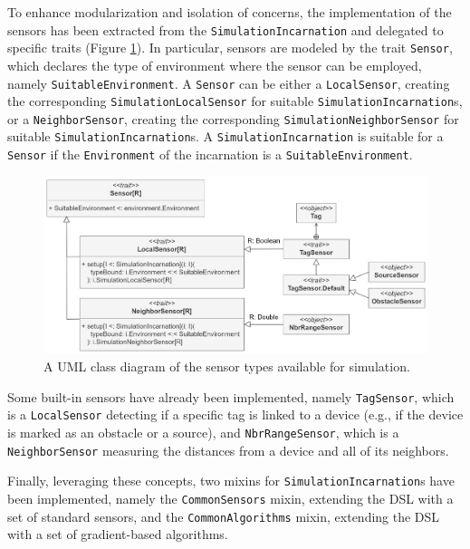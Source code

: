 To enhance modularization and isolation of concerns, the implementation of the
sensors has been extracted from the \texttt{SimulationIncarnation} and
delegated to specific traits (Figure \ref{figure:sensor-class-diagram}). In
particular, sensors are modeled by the trait \texttt{Sensor}, which declares
the type of environment where the sensor can be employed, namely
\texttt{SuitableEnviron\-ment}. A \texttt{Sensor} can be either a
\texttt{LocalSensor}, creating the corresponding
\texttt{Simula\-tion\-LocalSensor} for suitable
\texttt{SimulationIncarnation}s, or a \texttt{NeighborSensor}, creating the
corresponding \texttt{SimulationNeighborSensor} for suitable
\texttt{Simulation\-Incarnation}s. A \texttt{SimulationIncarnation} is suitable
for a \texttt{Sensor} if the \texttt{Environ\-ment} of the incarnation is a
\texttt{SuitableEnvironment}.

\begin{figure}[!ht]
  \centering
  \includegraphics[width=1\textwidth]{resources/figures/diagrams/short/sensor-class-diagram.pdf}
  \caption[A UML class diagram of the sensor types in FRASP]{
    A UML class diagram of the sensor types available for simulation.
  }
  \label{figure:sensor-class-diagram}
\end{figure}

Some built-in sensors have already been implemented, namely \texttt{TagSensor},
which is a \texttt{LocalSensor} detecting if a specific tag is linked to a
device (e.g., if the device is marked as an obstacle or a source), and
\texttt{NbrRangeSensor}, which is a \texttt{NeighborSensor} measuring the
distances from a device and all of its neighbors.

Finally, leveraging these concepts, two mixins for
\texttt{SimulationIncarnation}s have been implemented, namely the
\texttt{CommonSensors} mixin, extending the \ac{DSL} with a set of standard
sensors, and the \texttt{CommonAlgorithms} mixin, extending the \ac{DSL} with a
set of gradient-based algorithms.
